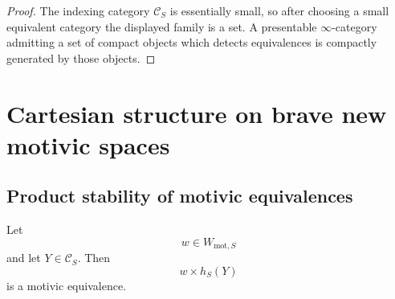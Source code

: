 \begin{proof}
The indexing category \(\mathcal C_S\) is essentially small, so after
choosing a small equivalent category the displayed family is a set. A
presentable \(\infty\)-category admitting a set of compact objects which
detects equivalences is compactly generated by those objects.
\end{proof}

\section{Cartesian structure on brave new motivic spaces}
\label{sec:brave-new-motivic-cartesian-structure}

\subsection{Product stability of motivic equivalences}

\begin{proposition}
\label{prop:motivic-generators-product-stable}
Let
\[
    w
    \in
    W_{\mathrm{mot},S}
\]
and let \(Y\in\mathcal C_S\). Then
\[
    w\times h_S(Y)
\]
is a motivic equivalence.
\end{proposition}

